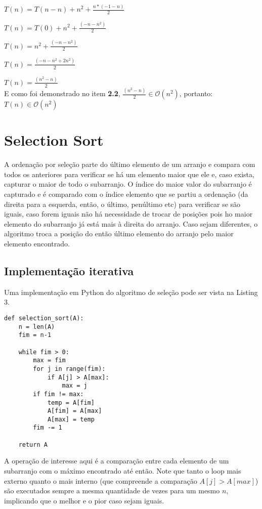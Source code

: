 \documentclass[a4paper, twocolumn]{article}
\theoremstyle{definition}
\begin{document}
$T(n) = T(n-n) + n^2 + \frac{n*(-1 - n)}{2}$

$T(n) = T(0) + n^2 + \frac{(-n - n^2)}{2}$

$T(n) = n^2 + \frac{(-n - n^2)}{2}$

$T(n) = \frac{(-n - n^2 + 2n^2)}{2}$

$T(n) = \frac{(n^2 - n)}{2}$\\

E como foi demonstrado no item \textbf{2.2}, $\frac{(n^2 - n)}{2} \in \mathcal{O}(n^2)$, portanto: \\

$T(n) \in \mathcal{O}(n^2)$

\section{Selection Sort}
A ordenação por seleção parte do último elemento de um arranjo e compara com todos os anteriores para verificar se há um elemento maior que ele e, caso exista, capturar o maior de todo o subarranjo. O índice do maior valor do subarranjo é capturado e é comparado com o índice elemento que se partiu a ordenação (da direita para a esquerda, então, o último, penúltimo etc) para verificar se são iguais, caso forem iguais não há necessidade de trocar de posições pois ho maior elemento do subarranjo já está mais à direita do arranjo. Caso sejam diferentes, o algoritmo troca a posição do então último elemento do arranjo pelo maior elemento encontrado.

\subsection{Implementação iterativa}

Uma implementação em Python do algoritmo de seleção pode ser vista na Listing 3.

\begin{lstlisting}[label=selection_sort,caption= Selection Sort iterativo]
def selection_sort(A):
    n = len(A)
    fim = n-1

    while fim > 0:
        max = fim
        for j in range(fim):
            if A[j] > A[max]:
                max = j
        if fim != max:
            temp = A[fim]
            A[fim] = A[max]
            A[max] = temp
        fim -= 1

    return A
\end{lstlisting}

A operação de interesse aqui é a comparação entre cada elemento de um subarranjo com o máximo encontrado até então. Note que tanto o loop mais externo quanto o mais interno (que compreende a comparação $A[j] > A[max]$) são executados sempre a mesma quantidade de vezes para um mesmo $n$, implicando que o melhor e o pior caso sejam iguais.
\end{document}
